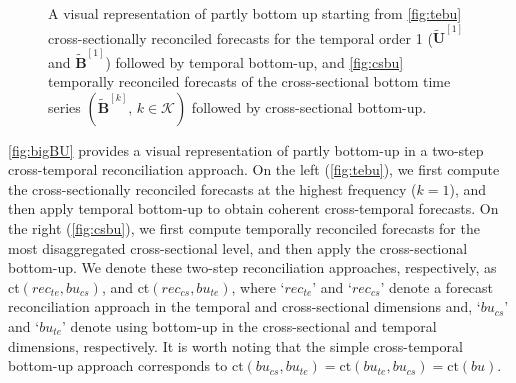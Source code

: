 \documentclass[a4paper,11pt]{article}
\newcommand{\Bvet}{\bm{B}}
\newcommand{\Uvet}{\bm{U}}
\theoremstyle{definition}
\begin{document}
\begin{figure}[!t]
\begin{subfigure}[b]{0.49\textwidth}
{}
		\label{fig:csbu}
	\end{subfigure}
	\vspace{-0.25cm}
	\caption{A visual representation of partly bottom up starting from \eqref{fig:tebu} cross-sectionally reconciled forecasts for the temporal order 1 ($\widetilde{\Uvet}^{[1]}$ and $\widetilde{\Bvet}^{[1]}$) followed by temporal bottom-up, and \eqref{fig:csbu} temporally reconciled forecasts of the cross-sectional bottom time series $(\widetilde{\Bvet}^{[k]}, \, k\in \mathcal{K})$ followed by cross-sectional bottom-up. %
	}
	\label{fig:bigBU}
\end{figure}

\autoref{fig:bigBU} provides a visual representation of partly bottom-up in a two-step cross-temporal reconciliation approach. On the left (\autoref{fig:tebu}), we first compute the cross-sectionally reconciled forecasts at the highest frequency ($k = 1$), and then apply temporal bottom-up to obtain coherent cross-temporal forecasts. On the right (\autoref{fig:csbu}), we first compute temporally reconciled forecasts for the most disaggregated cross-sectional level, and then apply the cross-sectional bottom-up. We denote these two-step reconciliation approaches, respectively, as ct$(rec_{te},bu_{cs})$, and ct$(rec_{cs},bu_{te})$, where ‘$rec_{te}$’ and ‘$rec_{cs}$’ denote a forecast reconciliation approach in the temporal and cross-sectional dimensions and, ‘$bu_{cs}$’ and ‘$bu_{te}$’ denote using bottom-up in the cross-sectional and temporal dimensions, respectively. It is worth noting that the simple cross-temporal bottom-up approach corresponds to $\mathrm{ct}(bu_{cs}, bu_{te})=\mathrm{ct}(bu_{te}, bu_{cs})=\mathrm{ct}(bu)$.
\end{document}
